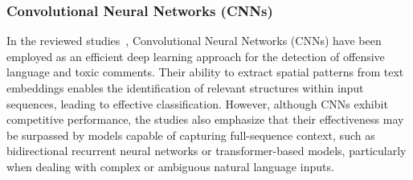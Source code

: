 \subsubsection{Convolutional Neural Networks (CNNs)}
In the reviewed studies~\cite{offensive2021,comparison2021,hatespeech2021}, Convolutional Neural Networks (CNNs) have been employed as an efficient deep learning approach for the detection of offensive language and toxic comments. Their ability to extract spatial patterns from text embeddings enables the identification of relevant structures within input sequences, leading to effective classification. However, although CNNs exhibit competitive performance, the studies also emphasize that their effectiveness may be surpassed by models capable of capturing full-sequence context, such as bidirectional recurrent neural networks or transformer-based models, particularly when dealing with complex or ambiguous natural language inputs.
